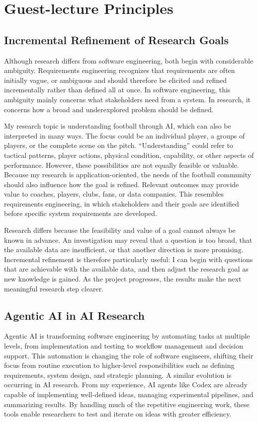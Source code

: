 \section{Guest-lecture Principles}

\subsection{Incremental Refinement of Research Goals}

Although research differs from software engineering, both begin with considerable ambiguity. Requirements engineering recognizes that requirements are often initially vague, or ambiguous and should therefore be elicited and refined incrementally rather than defined all at once. In software engineering, this ambiguity mainly concerns what stakeholders need from a system. In research, it concerns how a broad and underexplored problem should be defined.

My research topic is understanding football through AI, which can also be interpreted in many ways. The focus could be an individual player, a groups of players, or the complete scene on the pitch. ``Understanding'' could refer to tactical patterns, player actions, physical condition, capability, or other aspects of performance. However, these possibilities are not equally feasible or valuable. Because my research is application-oriented, the needs of the football community should also influence how the goal is refined. Relevant outcomes may provide value to coaches, players, clubs, fans, or data companies. This resembles requirements engineering, in which stakeholders and their goals are identified before specific system requirements are developed.

Research differs because the feasibility and value of a goal cannot always be known in advance. An investigation may reveal that a question is too broad, that the available data are insufficient, or that another direction is more promising. Incremental refinement is therefore particularly useful: I can begin with questions that are achievable with the available data, and then adjust the research goal as new knowledge is gained. As the project progresses, the results make the next meaningful research step clearer.

\subsection{Agentic AI in AI Research}


Agentic AI is transforming software engineering by automating tasks at multiple levels, from implementation and testing to workflow management and decision support. This automation is changing the role of software engineers, shifting their focus from routine execution to higher-level responsibilities such as defining requirements, system design, and strategic planning.
A similar evolution is occurring in AI research. From my experience, AI agents like Codex are already capable of implementing well-defined ideas, managing experimental pipelines, and summarizing results. By handling much of the repetitive engineering work, these tools enable researchers to test and iterate on ideas with greater efficiency.

